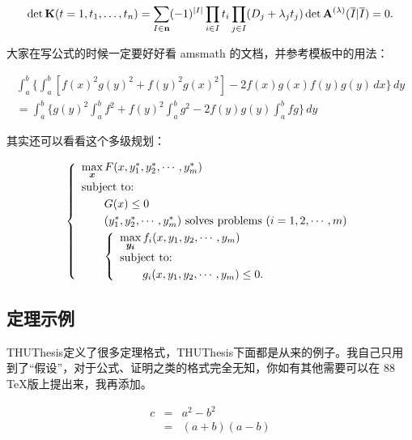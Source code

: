 \begin{equation}\label{detK2}
\det\mathbf{K}(t=1,t_1,\dots,t_n)=\sum_{I\in\mathbf{n}}(-1)^{\left\lvert I\right\rvert}
\prod_{i\in I}t_i\prod_{j\in I}(D_j+\lambda_jt_j)\det\mathbf{A}
^{(\lambda)}(\overline{I}|\overline{I})=0.
\end{equation} 

大家在写公式的时候一定要好好看 \textsf{amsmath} 的文档，并参考模板中的用法：

\begin{multline*}\tag{[b]} %
\int_a^b\biggl\{\int_a^b[f(x)^2g(y)^2+f(y)^2g(x)^2]
 -2f(x)g(x)f(y)g(y)\,dx\biggr\}\,dy \\
 =\int_a^b\biggl\{g(y)^2\int_a^bf^2+f(y)^2
  \int_a^b g^2-2f(y)g(y)\int_a^b fg\biggr\}\,dy
\end{multline*}

其实还可以看看这个多级规划：

\begin{equation}\label{bilevel}
\left\{\begin{array}{l}
\max\limits_{{\mbox{\footnotesize\boldmath $x$}}} F(x,y_1^*,y_2^*,\cdots,y_m^*)\\[0.2cm]
\mbox{subject to:}\\[0.1cm]
\qquad G(x)\le 0\\[0.1cm]
\qquad(y_1^*,y_2^*,\cdots,y_m^*)\mbox{ solves problems }(i=1,2,\cdots,m)\\[0.1cm]
\qquad\left\{\begin{array}{l}
    \max\limits_{{\mbox{\footnotesize\boldmath $y_i$}}}f_i(x,y_1,y_2,\cdots,y_m)\\[0.2cm]
    \mbox{subject to:}\\[0.1cm]
    \qquad g_i(x,y_1,y_2,\cdots,y_m)\le 0.
    \end{array}\right.
\end{array}\right.
\end{equation}

\subsection{定理示例}

THUThesis定义了很多定理格式，THUThesis下面都是从来的例子。我自己只用到了“假设”，对于公式、证明之类的格式完全无知，你如有其他需要可以在 88 \TeX 版上提出来，我再添加。

\begin{hypo}
  
\begin{eqnarray}
  \label{eq:eqnxmp}
  c & = & a^2 - b^2\\
    & = & (a+b)(a-b)
\end{eqnarray}
\end{hypo}

